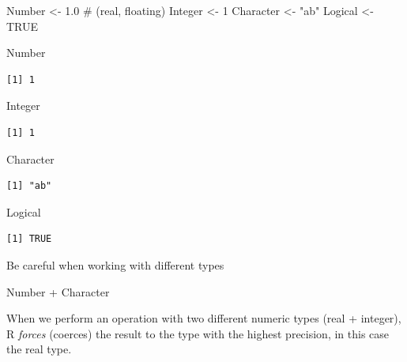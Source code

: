 \documentclass[
  letterpaper,
  DIV=11,
  numbers=noendperiod]{scrartcl}
\newenvironment{Shaded}{\begin{snugshade}}{\end{snugshade}}
\newcommand{\CommentTok}[1]{\textcolor[rgb]{0.37,0.37,0.37}{#1}}
\newcommand{\ConstantTok}[1]{\textcolor[rgb]{0.56,0.35,0.01}{#1}}
\newcommand{\DecValTok}[1]{\textcolor[rgb]{0.68,0.00,0.00}{#1}}
\newcommand{\FloatTok}[1]{\textcolor[rgb]{0.68,0.00,0.00}{#1}}
\newcommand{\NormalTok}[1]{\textcolor[rgb]{0.00,0.23,0.31}{#1}}
\newcommand{\OtherTok}[1]{\textcolor[rgb]{0.00,0.23,0.31}{#1}}
\newcommand{\SpecialCharTok}[1]{\textcolor[rgb]{0.37,0.37,0.37}{#1}}
\newcommand{\StringTok}[1]{\textcolor[rgb]{0.13,0.47,0.30}{#1}}
\begin{document}
\begin{Shaded}
\begin{Highlighting}[]
\NormalTok{Number }\OtherTok{\textless{}{-}} \FloatTok{1.0} \CommentTok{\# (real, floating)}
\NormalTok{Integer }\OtherTok{\textless{}{-}} \DecValTok{1}
\NormalTok{Character }\OtherTok{\textless{}{-}} \StringTok{"ab"}   
\NormalTok{Logical }\OtherTok{\textless{}{-}} \ConstantTok{TRUE}  

\NormalTok{Number}
\end{Highlighting}
\end{Shaded}

\begin{verbatim}
[1] 1
\end{verbatim}

\begin{Shaded}
\begin{Highlighting}[]
\NormalTok{Integer}
\end{Highlighting}
\end{Shaded}

\begin{verbatim}
[1] 1
\end{verbatim}

\begin{Shaded}
\begin{Highlighting}[]
\NormalTok{Character}
\end{Highlighting}
\end{Shaded}

\begin{verbatim}
[1] "ab"
\end{verbatim}

\begin{Shaded}
\begin{Highlighting}[]
\NormalTok{Logical}
\end{Highlighting}
\end{Shaded}

\begin{verbatim}
[1] TRUE
\end{verbatim}

Be careful when working with different types

\begin{Shaded}
\begin{Highlighting}[]
\NormalTok{Number }\SpecialCharTok{+}\NormalTok{ Character}
\end{Highlighting}
\end{Shaded}

When we perform an operation with two different numeric types (real +
integer), R \emph{forces} (coerces) the result to the type with the
highest precision, in this case the real type.
\end{document}

